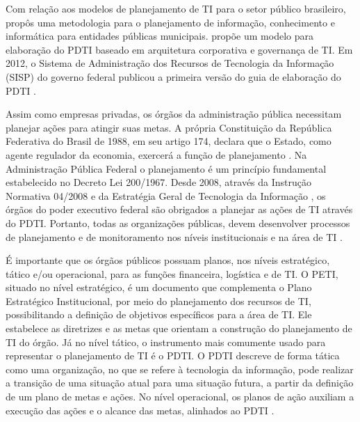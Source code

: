 Com relação aos modelos de planejamento de TI para o setor público brasileiro,  propôs uma metodologia para o planejamento de informação, conhecimento e informática para entidades públicas municipais.  propõe um modelo para elaboração do PDTI baseado em arquitetura corporativa e governança de TI. Em 2012, o Sistema de Administração dos Recursos de Tecnologia da Informação (SISP) do governo federal publicou a primeira versão do guia de elaboração do PDTI \cite{sisp:12}. %

Assim como empresas privadas, os órgãos da administração pública necessitam planejar ações para atingir suas metas. A própria Constituição da República Federativa do Brasil de 1988, em seu artigo 174, declara que o Estado, como agente regulador da economia, exercerá a função de planejamento \cite{cf:88}. Na Administração Pública Federal o planejamento é um princípio fundamental estabelecido no Decreto Lei 200/1967. Desde 2008, através da Instrução Normativa 04/2008 \cite{in04:08} e da Estratégia Geral de Tecnologia da Informação \cite{egti:08}, os órgãos do poder executivo federal são obrigados a planejar as ações de TI através do PDTI. Portanto, todas as organizações públicas, devem desenvolver processos de planejamento e de monitoramento nos níveis institucionais e na área de TI \cite{tcuManual:07}.  

É importante que os órgãos públicos possuam planos, nos níveis estratégico, tático e/ou operacional, para as funções financeira, logística e de TI. O PETI, situado no nível estratégico, é um documento que complementa o Plano Estratégico Institucional, por meio do planejamento dos recursos de TI, possibilitando a definição de objetivos específicos para a área de TI. Ele estabelece as diretrizes e as metas que orientam a construção do planejamento de TI do órgão. Já no nível tático, o instrumento mais comumente usado para representar o planejamento de TI é o PDTI. O PDTI descreve de forma tática como uma organização, no que se refere à tecnologia da informação, pode realizar a transição de uma situação atual para uma situação futura, a partir da definição de um plano de metas e ações. No nível operacional, os planos de ação auxiliam a execução das ações e o alcance das metas, alinhados ao PDTI \cite{sisp:15}. 

